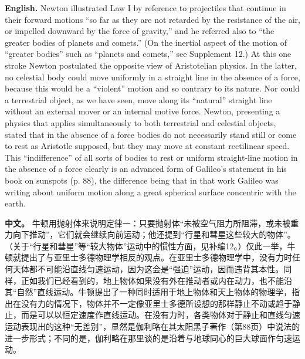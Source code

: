 \noindent\textbf{English.} Newton illustrated Law I by reference to projectiles that continue in their forward motions ``so far as they are not retarded by the resistance of the air, or impelled downward by the force of gravity,'' and he referred also to ``the greater bodies of planets and comets.'' (On the inertial aspect of the motion of ``greater bodies'' such as ``planets and comets,'' see Supplement 12.) At this one stroke Newton postulated the opposite view of Aristotelian physics. In the latter, no celestial body could move uniformly in a straight line in the absence of a force, because this would be a ``violent'' motion and so contrary to its nature. Nor could a terrestrial object, as we have seen, move along its ``natural'' straight line without an external mover or an internal motive force. Newton, presenting a physics that applies simultaneously to both terrestrial and celestial objects, stated that in the absence of a force bodies do not necessarily stand still or come to rest as Aristotle supposed, but they may move at constant rectilinear speed. This ``indifference'' of all sorts of bodies to rest or uniform straight-line motion in the absence of a force clearly is an advanced form of Galileo's statement in his book on sunspots (p. 88), the difference being that in that work Galileo was writing about uniform motion along a great spherical surface concentric with the earth.
\par\noindent\textbf{中文。} 牛顿用抛射体来说明定律一：只要抛射体“未被空气阻力所阻滞，或未被重力向下推动”，它们就会继续向前运动；他还提到“行星和彗星这些较大的物体”。（关于“行星和彗星”等“较大物体”运动中的惯性方面，见补编12。）仅此一举，牛顿就提出了与亚里士多德物理学相反的观点。在亚里士多德物理学中，没有力时任何天体都不可能沿直线匀速运动，因为这会是“强迫”运动，因而违背其本性。同样，正如我们已经看到的，地上物体如果没有外在推动者或内在动力，也不能沿其“自然”直线运动。牛顿提出了一种同时适用于地上物体和天上物体的物理学，指出在没有力的情况下，物体并不一定像亚里士多德所设想的那样静止不动或趋于静止，而是可以以恒定速度作直线运动。在没有力时，各类物体对于静止和直线匀速运动表现出的这种“无差别”，显然是伽利略在其太阳黑子著作（第88页）中说法的进一步形式；不同的是，伽利略在那里谈的是沿着与地球同心的巨大球面作匀速运动。
\medskip

